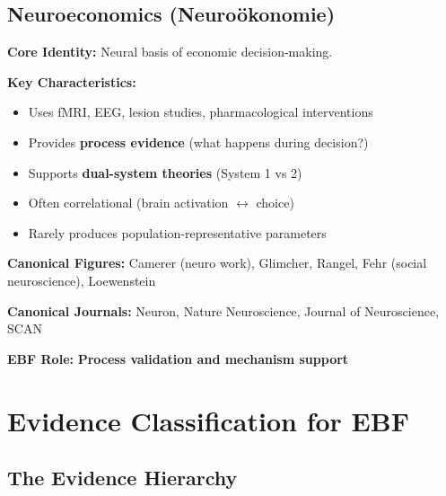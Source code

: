 \documentclass[11pt, a4paper]{article}
\begin{document}
\subsection{Neuroeconomics (Neuroökonomie)}

\begin{tcolorbox}[colback=purple!5!white, colframe=purple!75!black,
    title=Definition: Neuroeconomics]

\textbf{Core Identity:} Neural basis of economic decision-making.

\textbf{Key Characteristics:}
\begin{itemize}[nosep]
    \item Uses fMRI, EEG, lesion studies, pharmacological interventions
    \item Provides \textbf{process evidence} (what happens during decision?)
    \item Supports \textbf{dual-system theories} (System 1 vs 2)
    \item Often correlational (brain activation $\leftrightarrow$ choice)
    \item Rarely produces population-representative parameters
\end{itemize}

\textbf{Canonical Figures:}
Camerer (neuro work), Glimcher, Rangel, Fehr (social neuroscience), Loewenstein

\textbf{Canonical Journals:}
Neuron, Nature Neuroscience, Journal of Neuroscience, SCAN

\textbf{EBF Role:} \textbf{Process validation and mechanism support}

\end{tcolorbox}


\section{Evidence Classification for EBF}
\label{sec:evd-classification}

\subsection{The Evidence Hierarchy}
\end{document}
